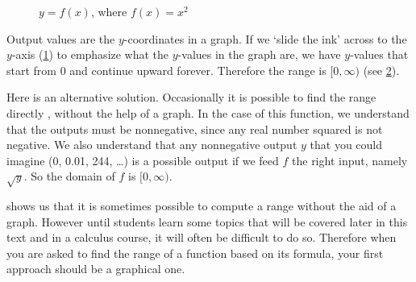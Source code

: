\begin{pccexample}
\begin{pccsolution}
\begin{figure}[!htb]
\begin{widepage}
\begin{subfigure}{.3\textwidth}
    \caption{}
	\label{fun:fig:slide}
    \end{subfigure}%
    \hfill
    \begin{subfigure}{.3\textwidth}
    \caption{}
    \label{fun:fig:rangeexamplerange}
  \end{subfigure}
	\caption{$y=f(x)$, where $f(x)=x^2$}
	\label{fun:fig:rangeexample}
  \end{widepage}
\end{figure}

Output values are the $y$-coordinates in a graph. If we `slide the ink' across to the $y$-axis (\cref{fun:fig:slide}) 
to emphasize what the $y$-values in the graph are, we have $y$-values that start from $0$ and continue upward forever. Therefore the range is $[0,\infty)$ 
(see \cref{fun:fig:rangeexamplerange}).
\end{pccsolution}

\begin{pccsolution}
Here is an alternative solution. Occasionally it is possible to find the range directly , without the help of a graph. In the case of this function, we understand that the outputs must be nonnegative, since any real number squared is not negative. We also understand that any nonnegative output $y$ that you could imagine (\num{0}, \num{0.01}, \num{244}, \ldots) is a possible output if we feed $f$ the right input, namely $\sqrt{y}$. So the domain of $f$ is $[0,\infty)$.
\end{pccsolution}
\end{pccexample}

\begin{pccspecialcomment}
	 shows us that it is sometimes possible to compute a range without the aid of a graph. However until students learn some topics that will be covered later in this text and in a calculus course, it will often be difficult to do so. Therefore when you are asked to find the range of a function based on its formula, your first approach should be a graphical one.
\end{pccspecialcomment}


